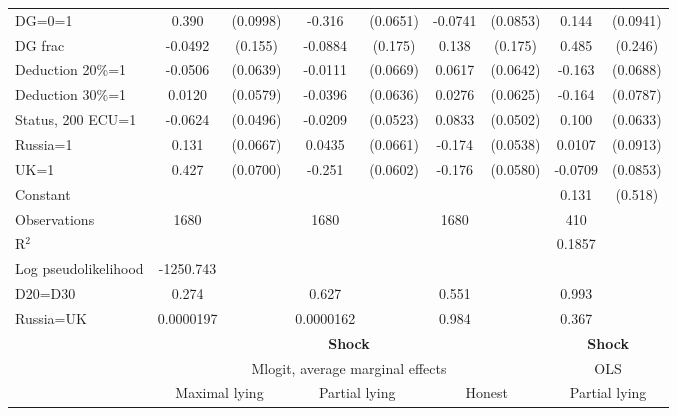 \begin{tabular}{l|cccccc|cc}
DG=0=1          &    0.390\sym{***}& (0.0998)&   -0.316\sym{***}& (0.0651)&  -0.0741         & (0.0853)&    0.144         & (0.0941)\\
DG frac         &  -0.0492         &  (0.155)&  -0.0884         &  (0.175)&    0.138         &  (0.175)&    0.485\sym{*}  &  (0.246)\\
Deduction 20\%=1&  -0.0506         & (0.0639)&  -0.0111         & (0.0669)&   0.0617         & (0.0642)&   -0.163\sym{**} & (0.0688)\\
Deduction 30\%=1&   0.0120         & (0.0579)&  -0.0396         & (0.0636)&   0.0276         & (0.0625)&   -0.164\sym{**} & (0.0787)\\
Status, 200 ECU=1&  -0.0624         & (0.0496)&  -0.0209         & (0.0523)&   0.0833\sym{*}  & (0.0502)&    0.100         & (0.0633)\\
Russia=1        &    0.131\sym{**} & (0.0667)&   0.0435         & (0.0661)&   -0.174\sym{***}& (0.0538)&   0.0107         & (0.0913)\\
UK=1            &    0.427\sym{***}& (0.0700)&   -0.251\sym{***}& (0.0602)&   -0.176\sym{***}& (0.0580)&  -0.0709         & (0.0853)\\
Constant        &                  &         &                  &         &                  &         &    0.131         &  (0.518)\\
\hline
Observations    &     1680         &         &     1680         &         &     1680         &         &      410         &         \\
R$^2$      &                  &         &                  &         &                  &         &         0.1857  &   \\ 
Log pseudolikelihood  & -1250.743   &         &                  &         &                  &         &           &   \\ 
D20=D30         &    0.274         &         &    0.627         &         &    0.551         &         &    0.993         &         \\
Russia=UK       &0.0000197         &         &0.0000162         &         &    0.984         &         &    0.367         &         \\
\hline\hline
&\multicolumn{6}{c|}{\bf Shock}&\multicolumn{2}{c}{\bf Shock}\\ &\multicolumn{6}{c|}{Mlogit, average marginal effects }&\multicolumn{2}{c}{OLS}\\
                &\multicolumn{2}{c}{Maximal lying}&\multicolumn{2}{c}{Partial lying}&\multicolumn{2}{c}{Honest}  &\multicolumn{2}{c}{Partial lying}\\

\end{tabular}
